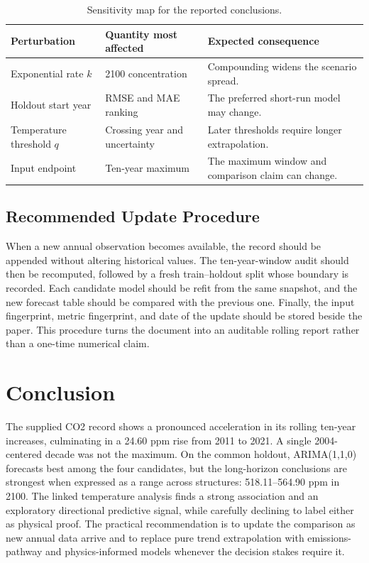 \documentclass{mcmthesis}
\begin{document}
\begin{table}[H]
\centering
\small
\caption{Sensitivity map for the reported conclusions.}
\begin{tabularx}{\textwidth}{lXX}
\toprule
Perturbation & Quantity most affected & Expected consequence \\
\midrule
Exponential rate $k$ & 2100 concentration & Compounding widens the scenario spread. \\
Holdout start year & RMSE and MAE ranking & The preferred short-run model may change. \\
Temperature threshold $q$ & Crossing year and uncertainty & Later thresholds require longer extrapolation. \\
Input endpoint & Ten-year maximum & The maximum window and comparison claim can change. \\
\bottomrule
\end{tabularx}
\end{table}

\subsection{Recommended Update Procedure}
When a new annual observation becomes available, the record should be appended without altering historical values. The ten-year-window audit should then be recomputed, followed by a fresh train--holdout split whose boundary is recorded. Each candidate model should be refit from the same snapshot, and the new forecast table should be compared with the previous one. Finally, the input fingerprint, metric fingerprint, and date of the update should be stored beside the paper. This procedure turns the document into an auditable rolling report rather than a one-time numerical claim.

\section{Conclusion}
The supplied CO2 record shows a pronounced acceleration in its rolling ten-year increases, culminating in a 24.60 ppm rise from 2011 to 2021. A single 2004-centered decade was not the maximum. On the common holdout, ARIMA(1,1,0) forecasts best among the four candidates, but the long-horizon conclusions are strongest when expressed as a range across structures: 518.11--564.90 ppm in 2100. The linked temperature analysis finds a strong association and an exploratory directional predictive signal, while carefully declining to label either as physical proof. The practical recommendation is to update the comparison as new annual data arrive and to replace pure trend extrapolation with emissions-pathway and physics-informed models whenever the decision stakes require it.
\end{document}
